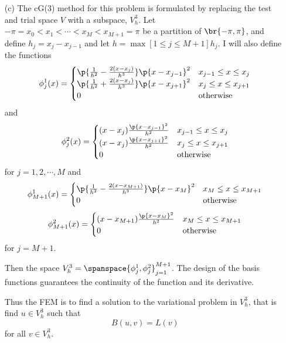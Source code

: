 \documentclass[11pt, oneside]{article}
\begin{document}
\begin{enumerate}
\begin{enumerate}
      \item[(c)] %
        The cG(3) method for this problem is formulated by replacing the test and
        trial space $V$ with a subspace, $V^3_h$.
        Let $-\pi = x_0 < x_1 < \cdots < x_M < x_{M+1} = \pi$ be a partition of
        $\br{-\pi, \pi}$, and define $h_j = x_{j} - x_{j-1}$ and let
        $h = \max[1 \le j \le M+1]{h_j}$.
        I will also define the functions
        \[
          \phi_j^1(x) =
          \begin{cases}
            \p{\frac{1}{h^2} - \frac{2(x - x_j)}{h^3}}\p{x - x_{j-1}}^2 & x_{j-1} \le x \le x_j \\
            \p{\frac{1}{h^2} + \frac{2(x - x_j)}{h^3}}\p{x - x_{j+1}}^2 & x_{j} \le x \le x_{j+1} \\
            0 & \text{otherwise}
          \end{cases}
        \]
        and
        \[
          \phi_j^2(x) =
          \begin{cases}
            (x - x_j)\frac{\p{x - x_{j-1}}^2}{h^2} & x_{j-1} \le x \le x_j \\
            (x - x_j)\frac{\p{x - x_{j+1}}^2}{h^2} & x_{j} \le x \le x_{j+1} \\
            0 & \text{otherwise}
          \end{cases}
        \]
        for $j = 1, 2, \cdots, M$ and
        \[
          \phi_{M+1}^1(x) =
          \begin{cases}
            \p{\frac{1}{h^2} - \frac{2(x - x_{M+1})}{h^3}}\p{x - x_{M}}^2 & x_{M} \le x \le x_{M+1} \\
            0 & \text{otherwise}
          \end{cases}
        \]
        \[
          \phi_{M+1}^2(x) =
          \begin{cases}
            (x - x_{M+1})\frac{\p{x - x_{M}}^2}{h^2} & x_{M} \le x \le x_{M+1} \\
            0 & \text{otherwise}
          \end{cases}
        \]
        for $j = M+1$.

        Then the space $V^3_h = \spanspace{\phi_j^1, \phi_j^2}_{j=1}^{M+1}$.
        The design of the basis functions guarantees the continuity of the
        function and its derivative.

        Thus the FEM is to find a solution to the variational problem in $V^3_h$,
        that is find $u \in V^3_h$ such that
        \[
          B(u, v) = L(v)
        \]
        for all $v \in V^3_h$.


\end{enumerate}
\end{enumerate}
\end{document}
